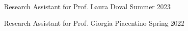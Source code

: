 

\begin{cventries}

\cventrysimple
	{Research Assistant for Prof. Laura Doval}  %
    {Summer 2023} %
    {}
    
\cventrysimple
    {Research Assistant for Prof. Giorgia Piacentino}  %
    {Spring 2022} %
    {}
	

\end{cventries}

